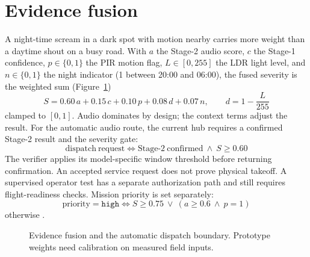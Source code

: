\documentclass[12pt,a4paper]{report}
\renewcommand{\texttt}[1]{\ifmmode\text{\rmfamily #1}\else{\rmfamily #1}\fi}
\begin{document}
\section{Evidence fusion}
\label{sec:fusion}

A night-time scream in a dark spot with motion nearby carries more
weight than a daytime shout on a busy road. With $a$ the Stage-2 audio
score, $c$ the Stage-1 confidence, $p \in \{0,1\}$ the PIR motion
flag, $L \in [0,255]$ the LDR light level, and $n \in \{0,1\}$ the
night indicator (1 between 20:00 and 06:00), the fused severity is the
weighted sum (Figure~\ref{fig:fusionfig})
\begin{equation}
\label{eq:fusioneq}
S = 0.60\,a + 0.15\,c + 0.10\,p + 0.08\,d + 0.07\,n,
\qquad d = 1 - \frac{L}{255}
\end{equation}
clamped to $[0,1]$. Audio dominates by design; the context terms
adjust the result. For the automatic audio route, the current hub
requires a confirmed Stage-2 result and the severity gate:
\begin{equation}
\label{eq:gate}
\mathrm{dispatch\ request} \iff
\mathrm{Stage\mbox{-}2\ confirmed}\ \wedge\ S \ge 0.60
\end{equation}
The verifier applies its model-specific window threshold before
returning confirmation. An accepted service request does not prove
physical takeoff. A supervised operator test has a separate
authorization path and still requires flight-readiness checks.
Mission priority is set separately:
\begin{equation}
\label{eq:priority}
\mathrm{priority} = \mathtt{high} \iff S \ge 0.75\ \vee\
\left(a \ge 0.6\ \wedge\ p = 1\right)
\end{equation}
otherwise \texttt{normal}.

\begin{figure}[htbp]
\centering
{}
\caption{Evidence fusion and the automatic dispatch boundary.
Prototype weights need calibration on measured field inputs.}
\label{fig:fusionfig}
\end{figure}
\end{document}
